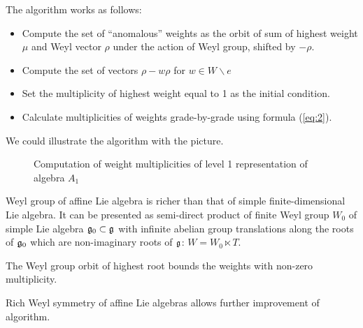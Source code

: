 \documentclass[a4paper,12pt]{article}
\theoremstyle{definition} \newtheorem{Def}{Definition}
\begin{document}
The algorithm works as follows:
\begin{itemize}
\item Compute the set of ``anomalous'' weights as the orbit of sum of
  highest weight $\mu$ and Weyl vector $\rho$ under the action of Weyl
  group, shifted by $-\rho$.
\item Compute the set of vectors $\rho-w\rho$ for $w\in W\backslash e$
\item Set the multiplicity of highest weight equal to 1 as the initial condition.
\item Calculate multiplicities of weights grade-by-grade using formula (\ref{eq:2}).
\end{itemize}

We could illustrate the algorithm with the picture.
\begin{figure}[bh]
  \noindent{}
  \caption{Computation of weight multiplicities of level 1
    representation of algebra $A_1$}
  \label{A1 with star}
\end{figure}

Weyl group of affine Lie algebra is richer than that of simple
finite-dimensional Lie algebra. It can be presented as semi-direct
product of finite Weyl group $W_0$ of simple Lie algebra
$\frak{g}_0\subset \frak{g}$ with infinite abelian group translations
along the roots of $\frak{g}_0$ which are non-imaginary roots of $\frak{g}$: 
$W=W_0\ltimes T$.

The Weyl group orbit of highest root bounds the weights with non-zero
multiplicity.

Rich Weyl symmetry of affine Lie algebras allows further improvement
of algorithm.
\end{document}
